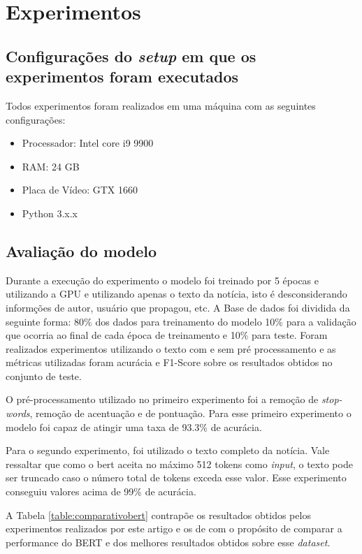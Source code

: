 \section{Experimentos}

\subsection{Configurações do \textit{setup} em que os experimentos foram executados}

Todos experimentos foram realizados em uma máquina com as seguintes configurações: 

\begin{itemize}
    \item Processador: Intel core i9 9900
    \item RAM: 24 GB
    \item Placa de Vídeo: GTX 1660
    \item Python 3.x.x
\end{itemize}

\subsection{Avaliação do modelo}

Durante a execução do experimento o modelo foi treinado por 5 épocas e utilizando a GPU e utilizando apenas o texto da notícia, isto é desconsiderando informções de autor, usuário que propagou, etc. A Base de dados foi dividida da seguinte forma: 80\% dos dados para treinamento do modelo 10\% para a validação que ocorria ao final de cada época de treinamento e 10\% para teste. Foram realizados experimentos utilizando o texto com e sem pré processamento e as métricas utilizadas foram acurácia e F1-Score sobre os resultados obtidos no conjunto de teste.

O pré-processamento utilizado no primeiro experimento foi a remoção de \textit{stop-words}, remoção de acentuação e de pontuação. Para esse primeiro experimento o modelo foi capaz de atingir uma taxa de 93.3\% de acurácia.

Para o segundo experimento, foi utilizado o texto completo da notícia. Vale ressaltar que como o bert aceita no máximo 512 tokens como \textit{input}, o texto pode ser truncado caso o número total de tokens exceda esse valor. Esse experimento conseguiu valores acima de 99\% de acurácia.

A Tabela \ref{table:comparativobert} contrapõe os resultados obtidos pelos experimentos realizados por este artigo e os de \citet{Silva2020} com o propósito de comparar a performance do BERT e dos melhores resultados obtidos sobre esse \textit{dataset}.


